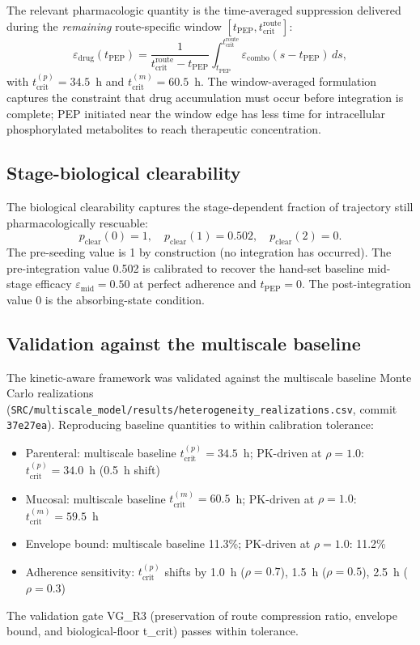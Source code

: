 \documentclass[11pt]{article}
\theoremstyle{definition}
\theoremstyle{remark}
\newcommand{\tcrit}{t_{\text{crit}}}
\newcommand{\emid}{\varepsilon_{\text{mid}}}
\begin{document}
The relevant pharmacologic quantity is the time-averaged suppression delivered during the \emph{remaining} route-specific window $[t_{\text{PEP}}, \tcrit^{\text{route}}]$:
\[
\varepsilon_{\text{drug}}(t_{\text{PEP}}) = \frac{1}{\tcrit^{\text{route}} - t_{\text{PEP}}} \int_{t_{\text{PEP}}}^{\tcrit^{\text{route}}} \varepsilon_{\text{combo}}(s - t_{\text{PEP}}) \, ds,
\]
with $\tcrit^{(p)} = 34.5$~h and $\tcrit^{(m)} = 60.5$~h. The window-averaged formulation captures the constraint that drug accumulation must occur before integration is complete; PEP initiated near the window edge has less time for intracellular phosphorylated metabolites to reach therapeutic concentration.

\subsection{Stage-biological clearability}

The biological clearability captures the stage-dependent fraction of trajectory still pharmacologically rescuable:
\[
p_{\text{clear}}(0) = 1, \quad p_{\text{clear}}(1) = 0.502, \quad p_{\text{clear}}(2) = 0.
\]
The pre-seeding value is 1 by construction (no integration has occurred). The pre-integration value 0.502 is calibrated to recover the hand-set baseline mid-stage efficacy $\emid = 0.50$ at perfect adherence and $t_{\text{PEP}} = 0$. The post-integration value 0 is the absorbing-state condition.

\subsection{Validation against the multiscale baseline}

The kinetic-aware framework was validated against the multiscale baseline Monte Carlo realizations (\nolinkurl{SRC/multiscale_model/results/heterogeneity_realizations.csv}, commit \texttt{37e27ea}). Reproducing baseline quantities to within calibration tolerance:
\begin{itemize}
\item Parenteral: multiscale baseline $\tcrit^{(p)} = 34.5$~h; PK-driven at $\rho = 1.0$: $\tcrit^{(p)} = 34.0$~h (0.5~h shift)
\item Mucosal: multiscale baseline $\tcrit^{(m)} = 60.5$~h; PK-driven at $\rho = 1.0$: $\tcrit^{(m)} = 59.5$~h
\item Envelope bound: multiscale baseline 11.3\%; PK-driven at $\rho = 1.0$: 11.2\%
\item Adherence sensitivity: $\tcrit^{(p)}$ shifts by 1.0~h ($\rho = 0.7$), 1.5~h ($\rho = 0.5$), 2.5~h ($\rho = 0.3$)
\end{itemize}
The validation gate VG\_R3 (preservation of route compression ratio, envelope bound, and biological-floor t\_crit) passes within tolerance.
\end{document}
